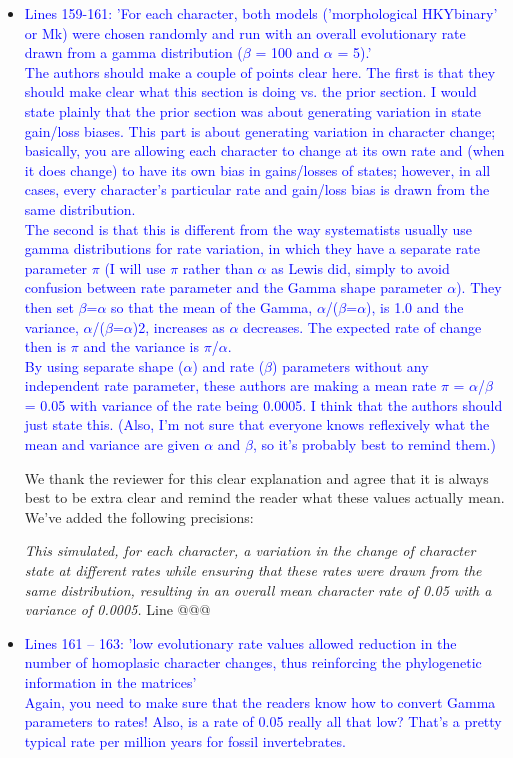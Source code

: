 \documentclass[12pt,letterpaper]{article}
\begin{document}
\begin{itemize}
\item{\textcolor{blue}{Lines 159-161: 'For each character, both models ('morphological HKYbinary' or Mk) were chosen randomly and run with an overall evolutionary rate drawn from a gamma distribution ($\beta$ = 100 and $\alpha$ = 5).'
\\
The authors should make a couple of points clear here. The first is that they should make clear what this section is doing vs. the prior section. I would state plainly that the prior section was about generating variation in state gain/loss biases. This part is about generating variation in character change; basically, you are allowing each character to change at its own rate and (when it does change) to have its own bias in gains/losses of states; however, in all cases, every character's particular rate and gain/loss bias is drawn from the same distribution.
\\
The second is that this is different from the way systematists usually use gamma distributions for rate variation, in which they have a separate rate parameter $\pi$ (I will use $\pi$ rather than $\alpha$ as Lewis did, simply to avoid confusion between rate parameter and the Gamma shape parameter $\alpha$). They then set $\beta$=$\alpha$ so that the mean of the Gamma, $\alpha$/($\beta$=$\alpha$), is 1.0 and the variance, $\alpha$/($\beta$=$\alpha$)2, increases as $\alpha$ decreases. The expected rate of change then is $\pi$ and the variance is $\pi$/$\alpha$.
\\
By using separate shape ($\alpha$) and rate ($\beta$) parameters without any independent rate parameter, these authors are making a mean rate $\pi$ = $\alpha$/$\beta$ = 0.05 with variance of the rate being 0.0005. I think that the authors should just state this. (Also, I'm not sure that everyone knows reflexively what the mean and variance are given $\alpha$ and $\beta$, so it's probably best to remind them.)}}

We thank the reviewer for this clear explanation and agree that it is always best to be extra clear and remind the reader what these values actually mean. We've added the following precisions:

\textit{This simulated, for each character, a variation in the change of character state at different rates while ensuring that these rates were drawn from the same distribution, resulting in an overall mean character rate of 0.05 with a variance of 0.0005.} Line @@@



\item{\textcolor{blue}{Lines 161 – 163: 'low evolutionary rate values allowed reduction in the number of homoplasic character changes, thus reinforcing the phylogenetic information in the matrices'
\\
Again, you need to make sure that the readers know how to convert Gamma parameters to rates! Also, is a rate of 0.05 really all that low? That's a pretty typical rate per million years for fossil invertebrates.}}


\end{itemize}
\end{document}
